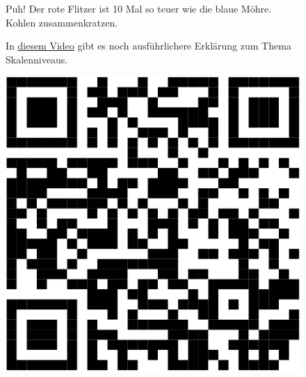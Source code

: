 \documentclass[
  letterpaper,
  twoside,
  open=any]{scrbook}
\theoremstyle{definition}
\theoremstyle{definition}
\theoremstyle{definition}
\theoremstyle{remark}
\begin{document}
\begin{figure}


\caption{\label{fig-verhaeltnis}Puh! Der rote Flitzer ist 10 Mal so
teuer wie die blaue Möhre. Kohlen zusammenkratzen.}

\end{figure}%

\begin{figure}

\begin{minipage}{0.80\linewidth}
In \href{https://www.youtube.com/watch?v=_mN3kFe56ng}{diesem Video} gibt
es noch ausführlichere Erklärung zum Thema Skalenniveaus.\end{minipage}%
%
\begin{minipage}{0.20\linewidth}

\begin{center}
\includegraphics[width=0.75\linewidth,height=\textheight,keepaspectratio]{010-rahmen_files/figure-pdf/qr-youtube-skalenniveaus-1.pdf}
\end{center}

\end{minipage}%

\end{figure}%
\end{document}
